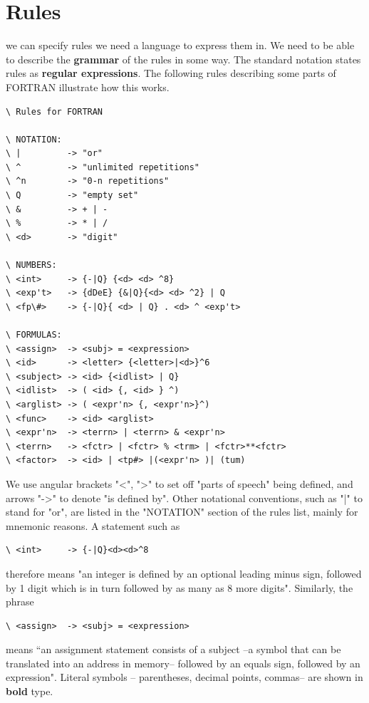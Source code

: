 \section{Rules}
 we can specify rules we need a language to express them in. We need to be able to describe the \textbf{grammar} of the rules in some way. The standard notation states rules as \textbf{regular expressions}. The following rules describing some parts of FORTRAN illustrate how this works.

\begin{verbatim}
\ Rules for FORTRAN

\ NOTATION:
\ |         -> "or"
\ ^         -> "unlimited repetitions"
\ ^n        -> "0-n repetitions"
\ Q         -> "empty set"
\ &         -> + | -
\ %         -> * | /
\ <d>       -> "digit"

\ NUMBERS:
\ <int>     -> {-|Q} {<d> <d> ^8}
\ <exp't>   -> {dDeE} {&|Q}{<d> <d> ^2} | Q
\ <fp\#>    -> {-|Q}{ <d> | Q} . <d> ^ <exp't>

\ FORMULAS:
\ <assign>  -> <subj> = <expression>
\ <id>      -> <letter> {<letter>|<d>}^6
\ <subject> -> <id> {<idlist> | Q}
\ <idlist>  -> ( <id> {, <id> } ^)
\ <arglist> -> ( <expr'n> {, <expr'n>}^)
\ <func>    -> <id> <arglist>
\ <expr'n>  -> <terrn> | <terrn> & <expr'n>
\ <terrn>   -> <fctr> | <fctr> % <trm> | <fctr>**<fctr>
\ <factor>  -> <id> | <tp#> |(<expr'n> )| (tum)

\end{verbatim}

We use angular brackets "<", ">" to set off "parts of speech" being defined, and arrows "->" to denote "is defined by". Other notational conventions, such as "|" to stand for "or", are listed in the "NOTATION" section of the rules list, mainly for mnemonic reasons. A statement such as

\begin{verbatim}
\ <int>     -> {-|Q}<d><d>^8
\end{verbatim}

therefore means "an integer is defined by an optional leading minus sign, followed by 1 digit which is in turn followed by as many as 8 more digits". Similarly, the phrase

\begin{verbatim}
\ <assign>  -> <subj> = <expression>
\end{verbatim}

means “an assignment statement consists of a subject --a symbol that can be translated into an address in memory-- followed by an equals sign, followed by an expression". Literal symbols -- parentheses, decimal points, commas-- are shown in \textbf{bold} type.

